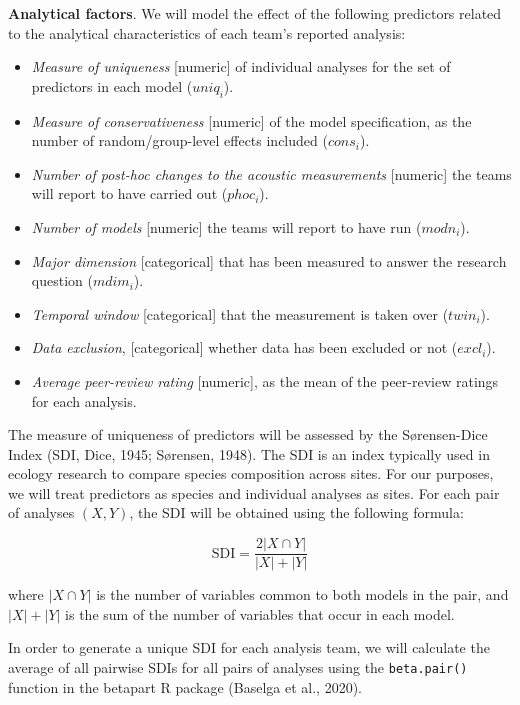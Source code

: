 \documentclass[
  english,
  man,floatsintext]{apa6}
\providecommand{\tightlist}{%
  \setlength{\itemsep}{0pt}\setlength{\parskip}{0pt}}
\begin{document}
\textbf{Analytical factors}. We will model the effect of the following predictors related to the analytical characteristics of each team's reported analysis:

\begin{itemize}
\tightlist
\item
  \emph{Measure of uniqueness} {[}numeric{]} of individual analyses for the set of predictors in each model (\(uniq_i\)).
\item
  \emph{Measure of conservativeness} {[}numeric{]} of the model specification, as the number of random/group-level effects included (\(cons_i\)).
\item
  \emph{Number of post-hoc changes to the acoustic measurements} {[}numeric{]} the teams will report to have carried out (\(phoc_i\)).
\item
  \emph{Number of models} {[}numeric{]} the teams will report to have run (\(modn_i\)).
\item
  \emph{Major dimension} {[}categorical{]} that has been measured to answer the research question (\(mdim_i\)).
\item
  \emph{Temporal window} {[}categorical{]} that the measurement is taken over (\(twin_i\)).
\item
  \emph{Data exclusion}, {[}categorical{]} whether data has been excluded or not (\(excl_i\)).
\item
  \emph{Average peer-review rating} {[}numeric{]}, as the mean of the peer-review ratings for each analysis.
\end{itemize}

The measure of uniqueness of predictors will be assessed by the Sørensen-Dice Index (SDI, Dice, 1945; Sørensen, 1948).
The SDI is an index typically used in ecology research to compare species composition across sites.
For our purposes, we will treat predictors as species and individual analyses as sites.
For each pair of analyses \((X, Y)\), the SDI will be obtained using the following formula:

\[\text{SDI} = \frac{2|X \cap Y|}{|X|+|Y|}\]

where \(|X \cap Y|\) is the number of variables common to both models in the pair, and \(|X|+|Y|\) is the sum of the number of variables that occur in each model.

In order to generate a unique SDI for each analysis team, we will calculate the average of all pairwise SDIs for all pairs of analyses using the \texttt{beta.pair()} function in the betapart R package (Baselga et al., 2020).
\end{document}
